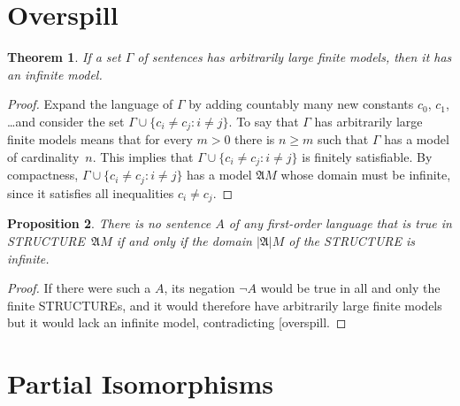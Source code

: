 \documentclass[10pt,a4paper]{article}
\makeatletter
\newcommand*{\olup}[1]{\MakeUppercase{#1}}
\theoremstyle{plain}
\newtheorem{thm}{Theorem}[section]
\newtheorem{prop}[thm]{Proposition}
\theoremstyle{definition}
\theoremstyle{remark}
\newcommand*{\olfileid}[3]{}
\newcommand*{\olsection}[1]{\section*{#1}}
\newcommand*{\ollabel}[1]{\label{#1}}
\newcommand{\olref}{\@ifnextchar[{\olref@i}{\olref@final}}
\def\olref@i[#1]{\@ifnextchar[{\olref@ii}{\olref@final}}
\def\olref@ii[#1]{\@ifnextchar[{\olref@iii}{\olref@final}}
\def\olref@iii[#1]{\olref@final}
\def\olref@final#1{\ref{#1}}
\providecommand{\Struct}{\ensuremath{\mathfrak{A}}}
\providecommand{\Domain}{\ensuremath{|\mathfrak{A}|}}
\makeatother
\begin{document}



\olfileid{mod}{bas}{ove}
\olsection{Overspill}

\begin{thm}
\ollabel{overspill} If a set $\Gamma$ of sentences has arbitrarily
large finite models, then it has an infinite model.
\end{thm}

\begin{proof}
Expand the language of $\Gamma$ by adding countably many new constants
$c_0$, $c_1$, \dots and consider the set $\Gamma \cup \{c_i \neq c_j :
i \neq j\}$. To say that $\Gamma$ has arbitrarily large finite models
means that for every $m >0$ there is $n\ge m$ such that $\Gamma$ has a
model of cardinality~$n$. This implies that $\Gamma \cup \{c_i \neq
c_j : i \neq j\}$ is finitely satisfiable. By compactness, $\Gamma
\cup \{c_i \neq c_j : i \neq j\}$ has a model $\Struct M$ whose domain
must be infinite, since it satisfies all inequalities $c_i \neq c_j$.
\end{proof}

\begin{prop}
\ollabel{inf-not-fo} 
There is no sentence $A$ of any first-order language that is true in
\olup{structure}~$\Struct M$ if and only if the domain $\Domain{M}$ of
the \olup{structure} is infinite.
\end{prop}

\begin{proof}
If there were such a $A$, its negation $\lnot A$ would be true in
all and only the finite \olup{structure}s, and it would therefore have
arbitrarily large finite models but it would lack an infinite model,
contradicting \olref{overspill}.
\end{proof}





\olfileid{mod}{bas}{pis}
\section{Partial Isomorphisms}
\end{document}
